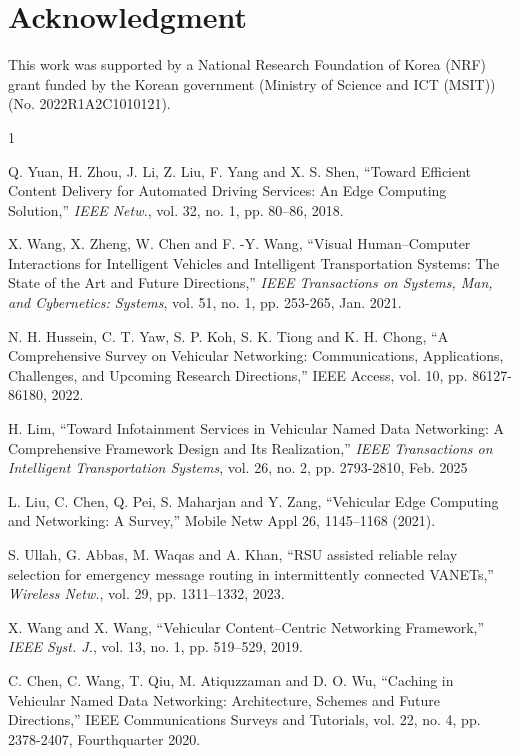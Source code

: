 \section*{Acknowledgment}
This work was supported by a National Research Foundation of Korea (NRF) grant funded by the Korean government (Ministry of Science and ICT (MSIT)) (No. 2022R1A2C1010121).


\begin{thebibliography}{1}
\setlength{\itemsep}{0pt} 
\setlength{\parskip}{0pt}

Q. Yuan, H. Zhou, J. Li, Z. Liu, F. Yang and X. S. Shen, ``Toward Efficient Content Delivery for Automated Driving Services: An Edge Computing Solution,'' \emph{IEEE Netw.}, vol. 32, no. 1, pp. 80–86, 2018.

X. Wang, X. Zheng, W. Chen and F. -Y. Wang, ``Visual Human–Computer Interactions for Intelligent Vehicles and Intelligent Transportation Systems: The State of the Art and Future Directions,'' \emph{IEEE Transactions on Systems, Man, and Cybernetics: Systems}, vol. 51, no. 1, pp. 253-265, Jan. 2021.

N. H. Hussein, C. T. Yaw, S. P. Koh, S. K. Tiong and K. H. Chong, ``A Comprehensive Survey on Vehicular Networking: Communications, Applications, Challenges, and Upcoming Research Directions,'' IEEE Access, vol. 10, pp. 86127-86180, 2022.

H. Lim, ``Toward Infotainment Services in Vehicular Named Data Networking: A Comprehensive Framework Design and Its Realization,'' \emph{IEEE Transactions on Intelligent Transportation Systems}, vol. 26, no. 2, pp. 2793-2810, Feb. 2025

L. Liu, C. Chen, Q. Pei, S. Maharjan and Y. Zang, ``Vehicular Edge Computing and Networking: A Survey,'' Mobile Netw Appl 26, 1145–1168 (2021).

S. Ullah, G. Abbas, M. Waqas and A. Khan, ``RSU assisted reliable relay selection for emergency message routing in intermittently connected VANETs,'' \emph{Wireless Netw.}, vol. 29, pp. 1311–1332, 2023.

X. Wang and X. Wang, ``Vehicular Content–Centric Networking Framework,'' \emph{IEEE Syst. J.}, vol. 13, no. 1, pp. 519–529, 2019.

C. Chen, C. Wang, T. Qiu, M. Atiquzzaman and D. O. Wu, ``Caching in Vehicular Named Data Networking: Architecture, Schemes and Future Directions,'' IEEE Communications Surveys and Tutorials, vol. 22, no. 4, pp. 2378-2407, Fourthquarter 2020.


\end{thebibliography}
